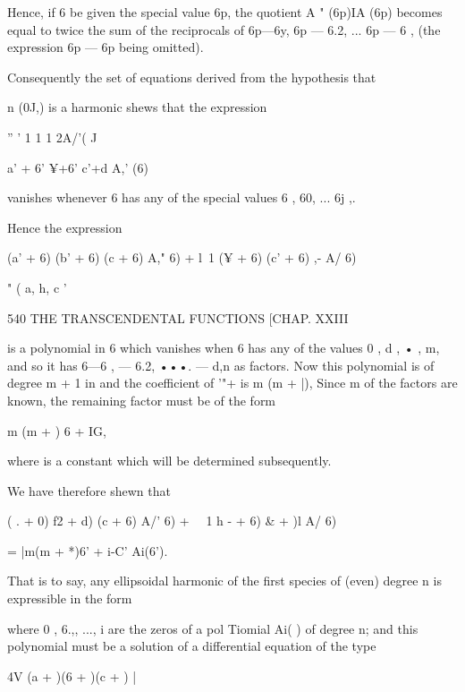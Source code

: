 Hence, if 6 be given the special value 6p, the quotient A " (6p)IA
(6p) becomes equal to twice the sum of the reciprocals of 6p—6y, 6p —
6.2, ... 6p — 6 , (the expression 6p — 6p being omitted).

Consequently the set of equations derived from the hypothesis that

n (0J,) is a harmonic shews that the expression

'' ' 1 1 1 2A/'( J

a' + 6' ¥+6' c'+d A,' (6)

vanishes whenever 6 has any of the special values 6 , 60, ... 6j ,.

Hence the expression

(a' + 6) (b' + 6) (c + 6) A," 6) + l\ 1 (¥ + 6) (c' + 6) ,- A/ 6)

" ( a, h, c '



540 THE TRANSCENDENTAL FUNCTIONS [CHAP. XXIII

is a polynomial in 6 which vanishes when 6 has any of the values 0 , d
, • , m, and so it has 6—6 , — 6.2, •••. — d,n as factors. Now this
polynomial is of degree m + 1 in and the coefficient of '"+ is m (m +
|), Since m of the factors are known, the remaining factor must be of
the form

m (m + ) 6 + IG,

where is a constant which will be determined subsequently.

We have therefore shewn that

( . + 0) f2 + d) (c + 6) A/' 6) + \ \ 1 h - + 6) \& + )l A/ 6)

= |m(m + *)6' + i-C' Ai(6').

That is to say, any ellipsoidal harmonic of the first species of
(even) degree n is expressible in the form

where 0 , 6.,, ..., i are the zeros of a pol Tiomial Ai( ) of degree
n; and this polynomial must be a solution of a differential equation
of the type



4V (a + )(6 + )(c + ) |



